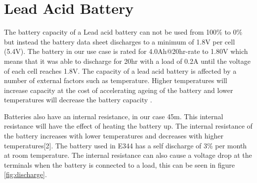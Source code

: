 \section{Lead Acid Battery}
\label{sec:Bat Intro}


\label{sec:batchar}
The battery capacity of a Lead acid battery can not be used from 100\% to 0\% but instead the battery data sheet discharges to a minimum of 1.8V per cell (5.4V). The battery in our use case is rated for 4.0Ah@20hr-rate to 1.80V which means that it was able to discharge for 20hr with a load of 0.2A until the voltage of each cell reaches 1.8V. The capacity of a lead acid battery is affected by a number of external factors such as temperature. Higher temperatures will increase capacity at the cost of accelerating ageing of the battery and lower temperatures will decrease the battery capacity  \cite{PVEducation}.

 Batteries also have an internal resistance, in our case 45m\textohm. This internal resistance will have the effect of heating the battery up. The internal resistance of the battery increases with lower temperatures and decreases with higher temperatures[2]. The battery used in E344 has a self discharge of 3\% per month at room temperature. The internal resistance can also cause a voltage drop \cite{BatteryUniversity} at the terminals when the battery is connected to a load, this can be seen in figure \ref{fig:discharge}.


